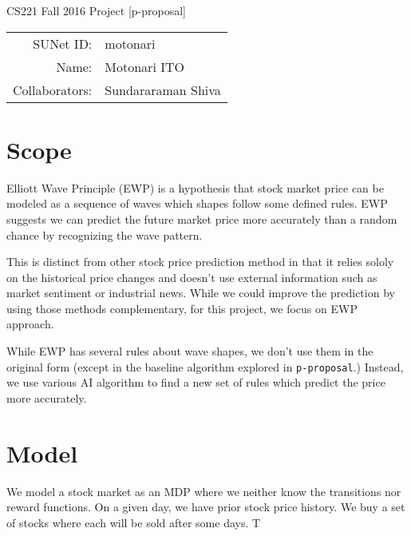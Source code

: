 \documentclass[12pt]{article}
\begin{document}
\begin{center}
{\Large CS221 Fall 2016 Project [p-proposal]}

\begin{tabular}{rl}
SUNet ID: & motonari \\
Name: & Motonari ITO \\
Collaborators: & Sundararaman Shiva
\end{tabular}
\end{center}

\section{Scope}

Elliott Wave Principle (EWP) is a hypothesis that stock market price
can be modeled as a sequence of waves which shapes follow some defined
rules. EWP suggests we can predict the future market price more
accurately than a random chance by recognizing the wave pattern.

This is distinct from other stock price prediction method in that it
relies sololy on the historical price changes and doesn't use external
information such as market sentiment or industrial news. While we
could improve the prediction by using those methods complementary, for
this project, we focus on EWP approach.

While EWP has several rules about wave shapes, we don't use them in
the original form (except in the baseline algorithm explored in
\verb|p-proposal|.) Instead, we use various AI algorithm to find a new
set of rules which predict the price more accurately.

\section{Model}

We model a stock market as an MDP where we neither know the
transitions nor reward functions. On a given day, we have prior stock
price history. We buy a set of stocks where each will be sold after
some days. T
\end{document}
